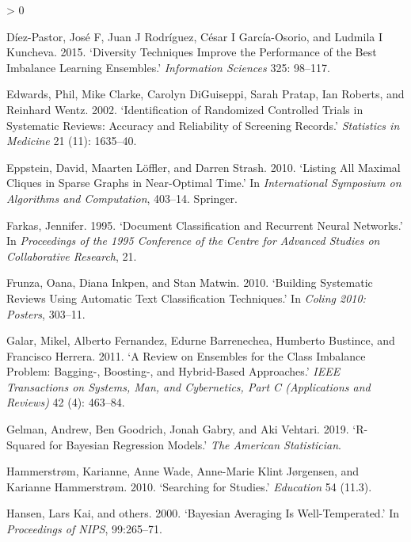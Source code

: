 \documentclass{article}
\newlength{\cslhangindent}
\newenvironment{CSLReferences}[2] %
 {%
  \setlength{\parindent}{0pt}
  \ifodd #1 \everypar{\setlength{\hangindent}{\cslhangindent}}\ignorespaces\fi
  \ifnum #2 > 0
  \setlength{\parskip}{#2\baselineskip}
  \fi
 }%
 {}
\begin{document}
\begin{CSLReferences}{1}{0}
\leavevmode\hypertarget{ref-diez2015diversity}{}%
Díez-Pastor, José F, Juan J Rodríguez, César I García-Osorio, and
Ludmila I Kuncheva. 2015. {`Diversity Techniques Improve the Performance
of the Best Imbalance Learning Ensembles.'} \emph{Information Sciences}
325: 98--117.

\leavevmode\hypertarget{ref-edwards2002identification}{}%
Edwards, Phil, Mike Clarke, Carolyn DiGuiseppi, Sarah Pratap, Ian
Roberts, and Reinhard Wentz. 2002. {`Identification of Randomized
Controlled Trials in Systematic Reviews: Accuracy and Reliability of
Screening Records.'} \emph{Statistics in Medicine} 21 (11): 1635--40.

\leavevmode\hypertarget{ref-eppstein2010listing}{}%
Eppstein, David, Maarten Löffler, and Darren Strash. 2010. {`Listing All
Maximal Cliques in Sparse Graphs in Near-Optimal Time.'} In
\emph{International Symposium on Algorithms and Computation}, 403--14.
Springer.

\leavevmode\hypertarget{ref-farkas1995document}{}%
Farkas, Jennifer. 1995. {`Document Classification and Recurrent Neural
Networks.'} In \emph{Proceedings of the 1995 Conference of the Centre
for Advanced Studies on Collaborative Research}, 21.

\leavevmode\hypertarget{ref-frunza2010building}{}%
Frunza, Oana, Diana Inkpen, and Stan Matwin. 2010. {`Building Systematic
Reviews Using Automatic Text Classification Techniques.'} In
\emph{Coling 2010: Posters}, 303--11.

\leavevmode\hypertarget{ref-galar2011review}{}%
Galar, Mikel, Alberto Fernandez, Edurne Barrenechea, Humberto Bustince,
and Francisco Herrera. 2011. {`A Review on Ensembles for the Class
Imbalance Problem: Bagging-, Boosting-, and Hybrid-Based Approaches.'}
\emph{IEEE Transactions on Systems, Man, and Cybernetics, Part C
(Applications and Reviews)} 42 (4): 463--84.

\leavevmode\hypertarget{ref-gelman2019r}{}%
Gelman, Andrew, Ben Goodrich, Jonah Gabry, and Aki Vehtari. 2019.
{`R-Squared for Bayesian Regression Models.'} \emph{The American
Statistician}.

\leavevmode\hypertarget{ref-hammerstrom2010searching}{}%
Hammerstrøm, Karianne, Anne Wade, Anne-Marie Klint Jørgensen, and
Karianne Hammerstrøm. 2010. {`Searching for Studies.'} \emph{Education}
54 (11.3).

\leavevmode\hypertarget{ref-hansen2000bayesian}{}%
Hansen, Lars Kai, and others. 2000. {`Bayesian Averaging Is
Well-Temperated.'} In \emph{Proceedings of NIPS}, 99:265--71.


\end{CSLReferences}
\end{document}
